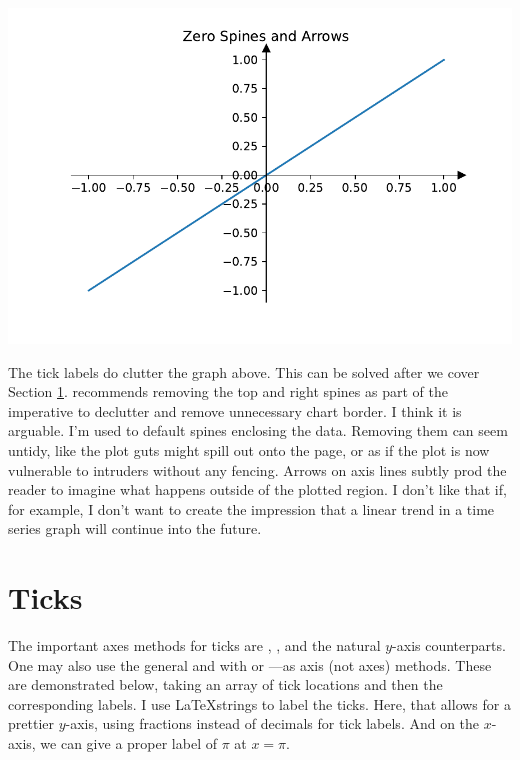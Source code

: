 \begin{center}
    \includegraphics[width = .7\textwidth]{figures/proseplots/arrow-axes.pdf}
\end{center}

The tick labels do clutter the graph above. This can be solved after we cover Section \ref{sec:ticks}. \cite{knaflic2015storytelling} recommends removing the top and right spines as part of the imperative to declutter and remove unnecessary chart border. I think it is arguable. I'm used to default spines enclosing the data. Removing them can seem untidy, like the plot guts might spill out onto the page, or as if the plot is now vulnerable to intruders without any fencing. Arrows on axis lines subtly prod the reader to imagine what happens outside of the plotted region. I don't like that if, for example, I don't want to create the impression that a linear trend in a time series graph will continue into the future. 


\section{Ticks}\label{sec:ticks}

The important axes methods for ticks are , , and the natural $y$-axis counterparts. One may also use the general  and  with  or ---as axis (not axes) methods. These are demonstrated below, taking an array of tick locations and then the corresponding labels. I use \LaTeX strings to label the ticks. Here, that allows for a prettier $y$-axis, using fractions instead of decimals for tick labels. And on the $x$-axis, we can give a proper label of $\pi$ at $x = \pi$.

